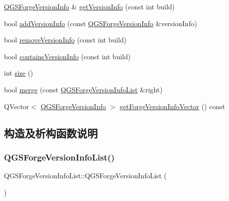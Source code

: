 \begin{DoxyCompactItemize}
\item 
\mbox{\hyperlink{class_q_g_s_forge_version_info}{Q\+G\+S\+Forge\+Version\+Info}} \& \mbox{\hyperlink{class_q_g_s_forge_version_info_list_aa55cd3a0e70ff3b5669bb58747b86af8}{get\+Version\+Info}} (const int build)
\item 
bool \mbox{\hyperlink{class_q_g_s_forge_version_info_list_a512fc1f9d14ef05204da4c33c634562c}{add\+Version\+Info}} (const \mbox{\hyperlink{class_q_g_s_forge_version_info}{Q\+G\+S\+Forge\+Version\+Info}} \&version\+Info)
\item 
bool \mbox{\hyperlink{class_q_g_s_forge_version_info_list_a7ca396dad424121abd1c003a51cc698c}{remove\+Version\+Info}} (const int build)
\item 
bool \mbox{\hyperlink{class_q_g_s_forge_version_info_list_ae88ca080b45adb1191cb40728433da38}{contains\+Version\+Info}} (const int build)
\item 
int \mbox{\hyperlink{class_q_g_s_forge_version_info_list_a240177f3ffee99e374b44ec3ce95c688}{size}} ()
\item 
bool \mbox{\hyperlink{class_q_g_s_forge_version_info_list_aeeb43f4418249e6da171e7fe60ff6f97}{merge}} (const \mbox{\hyperlink{class_q_g_s_forge_version_info_list}{Q\+G\+S\+Forge\+Version\+Info\+List}} \&right)
\item 
Q\+Vector$<$ \mbox{\hyperlink{class_q_g_s_forge_version_info}{Q\+G\+S\+Forge\+Version\+Info}} $>$ \mbox{\hyperlink{class_q_g_s_forge_version_info_list_ae30186ae3a36a33d2e73191016c58e5e}{get\+Forge\+Version\+Info\+Vector}} () const
\end{DoxyCompactItemize}


\subsection{构造及析构函数说明}
\mbox{\label{class_q_g_s_forge_version_info_list_a793adc40a37d1076532a7702949d8b87}} 
\subsubsection{\texorpdfstring{Q\+G\+S\+Forge\+Version\+Info\+List()}{QGSForgeVersionInfoList()}\hspace{0.1cm}{\footnotesize\ttfamily [1/3]}}
{\footnotesize\ttfamily Q\+G\+S\+Forge\+Version\+Info\+List\+::\+Q\+G\+S\+Forge\+Version\+Info\+List (\begin{DoxyParamCaption}{ }\end{DoxyParamCaption})}

